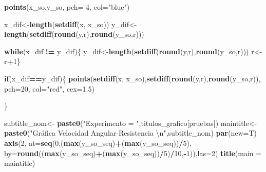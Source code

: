 \documentclass[]{article}
\newenvironment{Shaded}{\begin{snugshade}}{\end{snugshade}}
\newcommand{\KeywordTok}[1]{\textcolor[rgb]{0.13,0.29,0.53}{\textbf{#1}}}
\newcommand{\DataTypeTok}[1]{\textcolor[rgb]{0.13,0.29,0.53}{#1}}
\newcommand{\DecValTok}[1]{\textcolor[rgb]{0.00,0.00,0.81}{#1}}
\newcommand{\FloatTok}[1]{\textcolor[rgb]{0.00,0.00,0.81}{#1}}
\newcommand{\CharTok}[1]{\textcolor[rgb]{0.31,0.60,0.02}{#1}}
\newcommand{\StringTok}[1]{\textcolor[rgb]{0.31,0.60,0.02}{#1}}
\newcommand{\ControlFlowTok}[1]{\textcolor[rgb]{0.13,0.29,0.53}{\textbf{#1}}}
\newcommand{\OperatorTok}[1]{\textcolor[rgb]{0.81,0.36,0.00}{\textbf{#1}}}
\newcommand{\NormalTok}[1]{#1}
\begin{document}
\begin{Shaded}
\begin{Highlighting}[]
{{{{{{{{{{{{    \KeywordTok{points}\NormalTok{(x_so,y_so, }\DataTypeTok{pch=} \DecValTok{4}\NormalTok{, }\DataTypeTok{col=}\StringTok{"blue"}\NormalTok{)}
    
    
    
\NormalTok{    x_dif<-}\KeywordTok{length}\NormalTok{(}\KeywordTok{setdiff}\NormalTok{(x, x_so))}
\NormalTok{    y_dif<-}\KeywordTok{length}\NormalTok{(}\KeywordTok{setdiff}\NormalTok{(}\KeywordTok{round}\NormalTok{(y,r),}\KeywordTok{round}\NormalTok{(y_so,r)))}
    
    
    \ControlFlowTok{while}\NormalTok{(x_dif }\OperatorTok{!=}\StringTok{ }\NormalTok{y_dif)\{}
\NormalTok{      y_dif<-}\KeywordTok{length}\NormalTok{(}\KeywordTok{setdiff}\NormalTok{(}\KeywordTok{round}\NormalTok{(y,r),}\KeywordTok{round}\NormalTok{(y_so,r)))}
\NormalTok{      r<-r}\OperatorTok{+}\DecValTok{1}\NormalTok{\}}
    
    
    \ControlFlowTok{if}\NormalTok{(x_dif}\OperatorTok{==}\NormalTok{y_dif)\{}
      \KeywordTok{points}\NormalTok{(}\KeywordTok{setdiff}\NormalTok{(x, x_so),}\KeywordTok{setdiff}\NormalTok{(}\KeywordTok{round}\NormalTok{(y,r),}\KeywordTok{round}\NormalTok{(y_so,r)), }\DataTypeTok{pch=}\DecValTok{20}\NormalTok{, }\DataTypeTok{col=}\StringTok{"red"}\NormalTok{, }\DataTypeTok{cex=}\FloatTok{1.5}\NormalTok{)}
      
\NormalTok{    \}}
    
    
    
    
    
    
\NormalTok{    subtitle_nom<-}\StringTok{ }\KeywordTok{paste0}\NormalTok{(}\StringTok{"Experimento = "}\NormalTok{,titulos_grafico[pruebas])}
\NormalTok{    maintitle<-}\StringTok{ }\KeywordTok{paste0}\NormalTok{(}\StringTok{"Gráfica Velocidad Angular-Resistencia }\CharTok{\textbackslash{}n}\StringTok{"}\NormalTok{,subtitle_nom)}
    \KeywordTok{par}\NormalTok{(}\DataTypeTok{new=}\NormalTok{T)}
    \KeywordTok{axis}\NormalTok{(}\DecValTok{2}\NormalTok{, }\DataTypeTok{at=}\KeywordTok{seq}\NormalTok{(}\DecValTok{0}\NormalTok{,(}\KeywordTok{max}\NormalTok{(y_so_seq)}\OperatorTok{+}\NormalTok{(}\KeywordTok{max}\NormalTok{(y_so_seq))}\OperatorTok{/}\DecValTok{5}\NormalTok{), }\DataTypeTok{by=}\KeywordTok{round}\NormalTok{((}\KeywordTok{max}\NormalTok{(y_so_seq)}\OperatorTok{+}\NormalTok{(}\KeywordTok{max}\NormalTok{(y_so_seq))}\OperatorTok{/}\DecValTok{5}\NormalTok{)}\OperatorTok{/}\DecValTok{10}\NormalTok{,}\OperatorTok{-}\DecValTok{1}\NormalTok{)),}\DataTypeTok{las=}\DecValTok{2}\NormalTok{)}
    \KeywordTok{title}\NormalTok{(}\DataTypeTok{main =}\NormalTok{ maintitle)}
    
}}}}}}}}}}}}
\end{Highlighting}
\end{Shaded}
\end{document}
